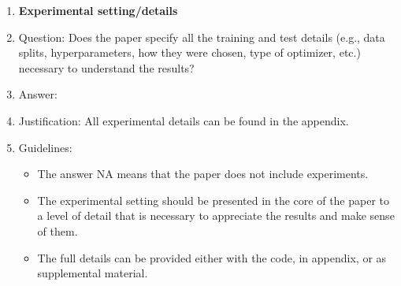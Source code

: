 \documentclass{article}
\theoremstyle{remark}
\begin{document}
\begin{enumerate}
\item {\bf Experimental setting/details}
    \item[] Question: Does the paper specify all the training and test details (e.g., data splits, hyperparameters, how they were chosen, type of optimizer, etc.) necessary to understand the results?
    \item[] Answer: \answerYes{} %
    \item[] Justification: All experimental details can be found in the appendix.
    \item[] Guidelines:
    \begin{itemize}
        \item The answer NA means that the paper does not include experiments.
        \item The experimental setting should be presented in the core of the paper to a level of detail that is necessary to appreciate the results and make sense of them.
        \item The full details can be provided either with the code, in appendix, or as supplemental material.
    \end{itemize}


\end{enumerate}
\end{document}
